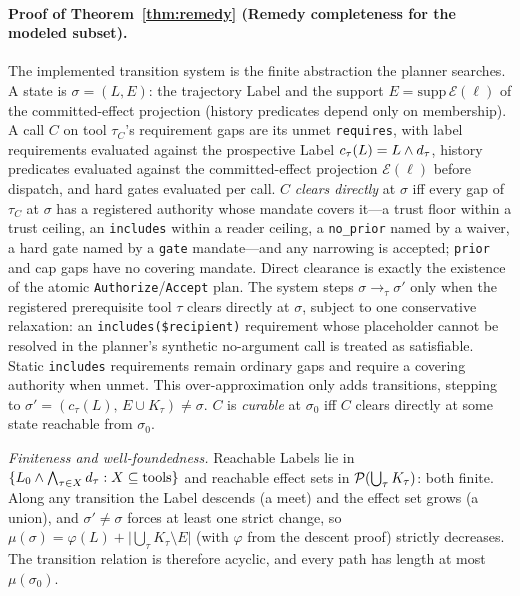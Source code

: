 \paragraph{Proof of Theorem~\ref{thm:remedy} (Remedy completeness for the modeled subset).}
The implemented transition system is the finite abstraction the planner searches. A state is $\sigma=(L,E)$: the trajectory Label and the support $E=\mathrm{supp}\,\mathcal{E}(\ell)$ of the committed-effect projection (history predicates depend only on membership). A call $C$ on tool $\tau_C$'s requirement gaps are its unmet \texttt{requires}, with label requirements evaluated against the prospective Label $c_\tau(L)=L\wedge d_\tau$, history predicates evaluated against the committed-effect projection $\mathcal{E}(\ell)$ before dispatch, and hard gates evaluated per call. $C$ \emph{clears directly} at $\sigma$ iff every gap of $\tau_C$ at $\sigma$ has a registered authority whose mandate covers it---a trust floor within a trust ceiling, an \texttt{includes} within a reader ceiling, a \texttt{no\_prior} named by a waiver, a hard gate named by a \texttt{gate} mandate---and any narrowing is accepted; \texttt{prior} and cap gaps have no covering mandate. Direct clearance is exactly the existence of the atomic \texttt{Authorize}/\texttt{Accept} plan. The system steps $\sigma\to_\tau\sigma'$ only when the registered prerequisite tool $\tau$ clears directly at $\sigma$, subject to one conservative relaxation: an \texttt{includes(\$recipient)} requirement whose placeholder cannot be resolved in the planner's synthetic no-argument call is treated as satisfiable. Static \texttt{includes} requirements remain ordinary gaps and require a covering authority when unmet. This over-approximation only adds transitions, stepping to $\sigma'=(c_\tau(L),\,E\cup K_\tau)\ne\sigma$. $C$ is \emph{curable} at $\sigma_0$ iff $C$ clears directly at some state reachable from $\sigma_0$.

\emph{Finiteness and well-foundedness.} Reachable Labels lie in $\{L_0\wedge\bigwedge_{\tau\in X}d_\tau : X\subseteq\text{tools}\}$ and reachable effect sets in $\mathcal{P}(\bigcup_\tau K_\tau)$: both finite. Along any transition the Label descends (a meet) and the effect set grows (a union), and $\sigma'\ne\sigma$ forces at least one strict change, so $\mu(\sigma)=\varphi(L)+\lvert\bigcup_\tau K_\tau\setminus E\rvert$ (with $\varphi$ from the descent proof) strictly decreases. The transition relation is therefore acyclic, and every path has length at most $\mu(\sigma_0)$.

